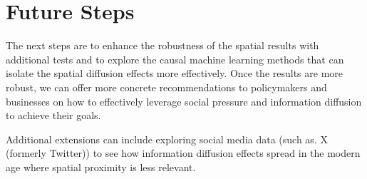 \documentclass[11pt]{article}
\begin{document}
\section{Future Steps}
The next steps are to enhance the robustness of the spatial results with additional tests and to explore the causal machine learning methods that can isolate the spatial diffusion effects more effectively. Once the results are more robust, we can offer more concrete recommendations to policymakers and businesses on how to effectively leverage social pressure and information diffusion to achieve their goals.

Additional extensions can include exploring social media data (such as. X (formerly Twitter)) to see how information diffusion effects spread in the modern age where spatial proximity is less relevant.


\end{document}
